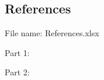 \documentclass[12pt,a4paper]{scrartcl}
\begin{document}
\newpage%
\subsection{References}

File name: References.xlsx

\begin{samepage}
  \noindent{}Part 1:\\{}
  \noindent{}
\end{samepage}

\begin{samepage}
  \noindent{}Part 2:\\{}
  \noindent{}
\end{samepage}
\end{document}
